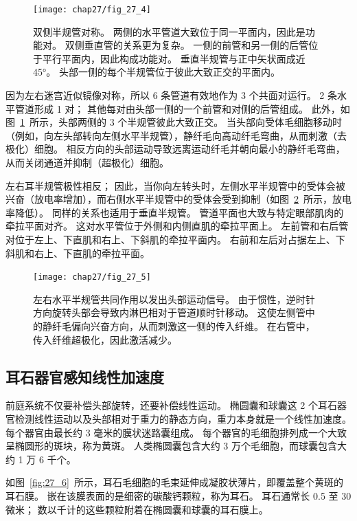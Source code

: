 \begin{figure}[htbp]
	\centering
	\texttt{[image: chap27/fig\_27\_4]}
	\caption{双侧半规管对称。
		两侧的水平管道大致位于同一平面内，因此是功能对。
		双侧垂直管的关系更为复杂。
		一侧的前管和另一侧的后管位于平行平面内，因此构成功能对。
		垂直半规管与正中矢状面成近 45°。
		头部一侧的每个半规管位于彼此大致正交的平面内。}
	\label{fig:27_4}
\end{figure}


因为左右迷宫近似镜像对称，所以 6 条管道有效地作为 3 个共面对运行。
2 条水平管道形成 1 对；
其他每对由头部一侧的一个前管和对侧的后管组成。
此外，如图~\ref{fig:27_4}~所示，头部两侧的 3 个半规管彼此大致正交。
当头部向受体毛细胞移动时（例如，向左头部转向左侧水平半规管），静纤毛向高动纤毛弯曲，从而刺激（去极化）细胞。
相反方向的头部运动导致远离运动纤毛并朝向最小的静纤毛弯曲，从而关闭通道并抑制（超极化）细胞。


左右耳半规管极性相反；
因此，当你向左转头时，左侧水平半规管中的受体会被兴奋（放电率增加），而右侧水平半规管中的受体会受到抑制（如图~\ref{fig:27_5}~所示，放电率降低）。
同样的关系也适用于垂直半规管。
管道平面也大致与特定眼部肌肉的牵拉平面对齐。
这对水平管位于外侧和内侧直肌的牵拉平面上。
左前管和右后管对位于左上、下直肌和右上、下斜肌的牵拉平面内。
右前和左后对占据左上、下斜肌和右上、下直肌的牵拉平面。


\begin{figure}[htbp]
	\centering
	\texttt{[image: chap27/fig\_27\_5]}
	\caption{左右水平半规管共同作用以发出头部运动信号。
		由于惯性，逆时针方向旋转头部会导致内淋巴相对于管道顺时针移动。
		这使左侧管中的静纤毛偏向兴奋方向，从而刺激这一侧的传入纤维。
		在右管中，传入纤维超极化，因此激活减少。}
	\label{fig:27_5}
\end{figure}



\subsection{耳石器官感知线性加速度}

前庭系统不仅要补偿头部旋转，还要补偿线性运动。
椭圆囊和球囊这 2 个耳石器官检测线性运动以及头部相对于重力的静态方向，重力本身就是一个线性加速度。
每个器官由最长约 3 毫米的膜状迷路囊组成。
每个器官的毛细胞排列成一个大致呈椭圆形的斑块，称为黄斑。
人类椭圆囊包含大约 3 万个毛细胞，而球囊包含大约 1 万 6 千个。


如图~\ref{fig:27_6}~所示，耳石毛细胞的毛束延伸成凝胶状薄片，即覆盖整个黄斑的耳石膜。
嵌在该膜表面的是细密的碳酸钙颗粒，称为耳石。
耳石通常长 0.5 至 30 微米；
数以千计的这些颗粒附着在椭圆囊和球囊的耳石膜上。


